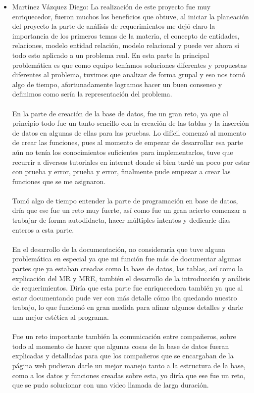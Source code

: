 \documentclass[12pt,letterpaper]{article}
\begin{document}
\begin{itemize}
		\item Martínez Vázquez Diego:
		\subitem La realización de este proyecto fue muy enriquecedor, fueron muchos los beneficios que obtuve, al iniciar la planeación del proyecto la parte de análisis de requerimientos me dejó claro la importancia de los primeros temas de la materia, el concepto de entidades, relaciones, modelo entidad relación, modelo relacional y puede ver ahora si todo esto aplicado a un problema real. En esta parte la principal problemática es que como equipo teníamos soluciones diferentes y propuestas diferentes al problema, tuvimos que analizar de forma grupal y eso nos tomó algo de tiempo, afortunadamente logramos hacer un buen consenso y definimos como sería la representación del problema.\\
		\\En la parte de creación de la base de datos, fue un gran reto, ya que al principio todo fue un tanto sencillo con la creación de las tablas y la inserción de datos en algunas de ellas para las pruebas. Lo difícil comenzó al momento de crear las funciones, pues al momento de empezar de desarrollar esa parte aún no tenía los conocimientos suficientes para implementarlos, tuve que recurrir a diversos tutoriales en internet donde si bien tardé un poco por estar con prueba y error, prueba y error, finalmente pude empezar a crear las funciones que se me asignaron.\\ 	
		\\Tomó algo de tiempo entender la parte de programación en base de datos, dría que ese fue un reto muy fuerte, así como fue un gran acierto comenzar a trabajar de forma autodidacta, hacer múltiples intentos y dedicarle días enteros a esta parte.\\
		\\En el desarrollo de la documentación, no consideraría que tuve alguna problemática en especial ya que mi función fue más de documentar algunas partes que ya estaban creadas como la base de datos, las tablas, así como la explicación del MR y MRE, también el desarrollo de la introducción y análisis de requerimientos. Diría que esta parte fue enriquecedora también ya que al estar documentando pude ver con más detalle cómo iba quedando nuestro trabajo, lo que funcionó en gran medida para afinar algunos detalles y darle una mejor estética al programa. \\
		\\Fue un reto importante también la comunicación entre compañeros, sobre todo al momento de hacer que algunas cosas de la base de datos fueran explicadas y detalladas para que los compañeros que se encargaban de la página web pudieran darle un mejor manejo tanto a la estructura de la base, como a los datos y funciones creadas sobre esta, yo diría que ese fue un reto, que se pudo solucionar con una video llamada de larga duración. \\
		

\end{itemize}
\end{document}
